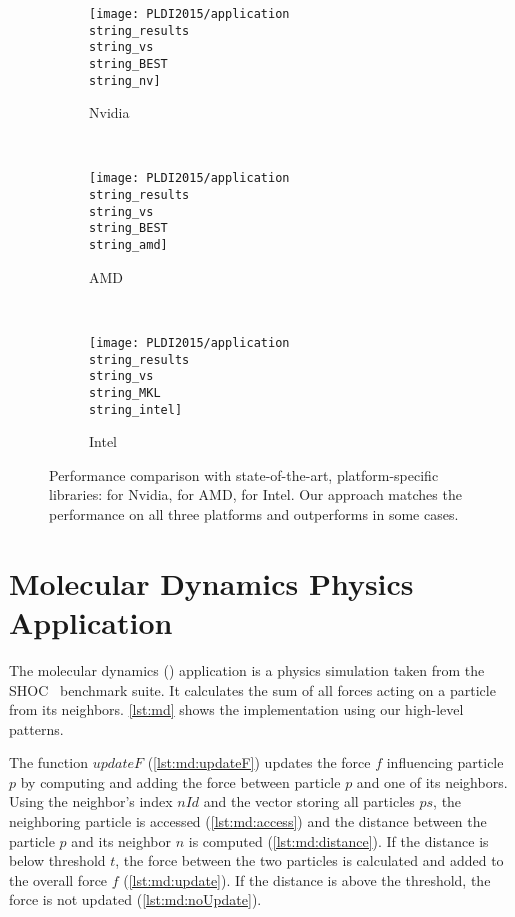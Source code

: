 \begin{figure*}[p]
  \centering
  \begin{subfigure}[b]{0.65\linewidth}
    \texttt{[image: PLDI2015/application\\string\_results\\string\_vs\\string\_BEST\\string\_nv]}
    \caption{Nvidia \GPU}
    \label{fig:linear-algebra-expr:results:nv}
  \end{subfigure}
  \\
  \begin{subfigure}[b]{0.65\linewidth}
    \texttt{[image: PLDI2015/application\\string\_results\\string\_vs\\string\_BEST\\string\_amd]}
    \caption{AMD \GPU}
    \label{fig:linear-algebra-expr:results:amd}
  \end{subfigure}
  \\
  \begin{subfigure}[b]{0.65\linewidth}
    \texttt{[image: PLDI2015/application\\string\_results\\string\_vs\\string\_MKL\\string\_intel]}
    \caption{Intel \CPU}
    \label{fig:linear-algebra-expr:results:intel}
  \end{subfigure}
  \caption[Performance comparison with state-of-the-art, platform-specific libraries]%
          {Performance comparison with state-of-the-art, platform-specific libraries: \CUBLAS for Nvidia, \clBLAS for AMD, \MKL for Intel.
           Our approach matches the performance on all three platforms and outperforms \clBLAS in some cases.
         }
   \label{fig:linear-algebra-expr:results}
\end{figure*}

\section{Molecular Dynamics Physics Application}

The molecular dynamics (\MD) application is a physics simulation taken from the {\small SHOC}~\cite{DanalisMMMRSTV10} benchmark suite.
It calculates the sum of all forces acting on a particle from its neighbors.
\autoref{lst:md} shows the implementation using our high-level patterns.

The function $updateF$ (\autoref{lst:md:updateF}) updates the force $f$ influencing particle $p$ by computing and adding the force between particle $p$ and one of its neighbors.
Using the neighbor's index $nId$ and the vector storing all particles $ps$, the neighboring particle is accessed (\autoref{lst:md:access}) and the distance between the particle $p$ and its neighbor $n$ is computed (\autoref{lst:md:distance}).
If the distance is below threshold $t$, the force between the two particles is calculated and added to the overall force $f$ (\autoref{lst:md:update}).
If the distance is above the threshold, the force is not updated (\autoref{lst:md:noUpdate}).

